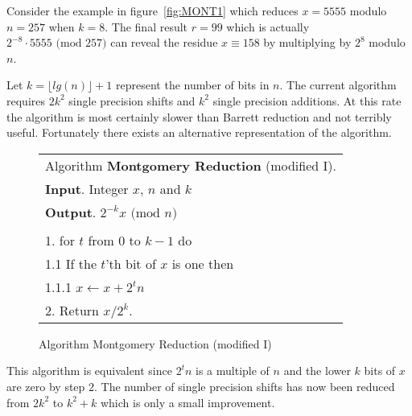 \documentclass[b5paper]{book}
\begin{document}
Consider the example in figure~\ref{fig:MONT1} which reduces $x = 5555$ modulo $n = 257$ when $k = 8$.  The final result $r = 99$ which is actually
$2^{-8} \cdot 5555 \mbox{ (mod }257\mbox{)}$ can reveal the residue $x \equiv 158$ by multiplying by $2^8$ modulo $n$.  

Let $k = \lfloor lg(n) \rfloor + 1$ represent the number of bits in $n$.  The current algorithm requires $2k^2$ single precision shifts
and $k^2$ single precision additions.  At this rate the algorithm is most certainly slower than Barrett reduction and not terribly useful.  
Fortunately there exists an alternative representation of the algorithm.

\begin{figure}[!here]
\begin{small}
\begin{center}
\begin{tabular}{l}
\hline Algorithm \textbf{Montgomery Reduction} (modified I). \\
\textbf{Input}.   Integer $x$, $n$ and $k$ \\
\textbf{Output}.  $2^{-k}x \mbox{ (mod }n\mbox{)}$ \\
\hline \\
1.  for $t$ from $0$ to $k - 1$ do \\
\hspace{3mm}1.1  If the $t$'th bit of $x$ is one then \\
\hspace{6mm}1.1.1  $x \leftarrow x + 2^tn$ \\
2.  Return $x/2^k$. \\
\hline
\end{tabular}
\end{center}
\end{small}
\caption{Algorithm Montgomery Reduction (modified I)}
\end{figure}

This algorithm is equivalent since $2^tn$ is a multiple of $n$ and the lower $k$ bits of $x$ are zero by step 2.  The number of single
precision shifts has now been reduced from $2k^2$ to $k^2 + k$ which is only a small improvement.
\end{document}
